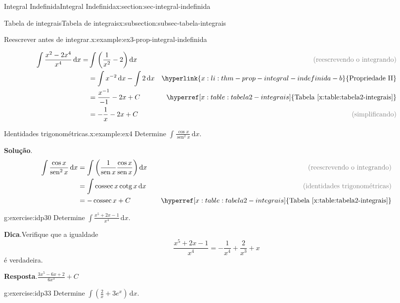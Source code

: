 \documentclass[oneside,10pt,]{article}
\newcommand{\blocktitlefont}{\relax}
\newcommand{\xreffont}{\relax}
\numberwithin{equation}{section}
\newcommand{\dd}{\mathrm{d}}
\newcommand{\integral}[2]{\displaystyle\int {#1}\,\dd {#2}}
\DeclareMathOperator{\sin}{sen}
\DeclareMathOperator{\csc}{cossec}
\DeclareMathOperator{\cot}{cotg}
\newcommand{\amp}{&}
\begin{document}
\begin{sectionptx}{Integral Indefinida}{}{Integral Indefinida}{}{}{x:section:sec-integral-indefinida}
\begin{subsectionptx}{Tabela de integrais}{}{Tabela de integrais}{}{}{x:subsection:subsec-tabela-integrais}
\begin{example}{Reescrever antes de integrar.}{x:example:ex3-prop-integral-indefinida}
\par\smallskip%
\noindent%
\begin{align*}
\integral{\frac{x^2- 2x^4}{x^4}}{x} = \amp \integral{\left(\frac{1}{x^2}-2\right)}{x} \quad \amp \color{gray}{\text{(reescrevendo o integrando)}}\\
\amp =\integral{x^{-2}}{x}-\integral{2}{x} \amp \hyperlink{x:li:thm-prop-integral-indefinida-b}{\text{Propriedade II}}\\
\amp =\frac{x^{-1}}{-1}-2x + C  \amp \hyperref[x:table:tabela2-integrais]{\text{Tabela {\xreffont\ref{x:table:tabela2-integrais}}}}\\
\amp =-\frac{1}{x}-2x + C \amp \color{gray}{\text{(simplificando)}}
\end{align*}
%
%
\end{example}
\begin{example}{Identidades trigonométricas.}{x:example:ex4}%
Determine \(\integral{\frac{\cos{x}}{\sin^2{x}}}{x}\).%
\par\smallskip%
\noindent\textbf{\blocktitlefont Solução}.\hypertarget{g:solution:idp29}{}\quad{}%
\begin{align*}
\integral{\frac{\cos{x}}{\sin^2{x}}}{x}\amp = \integral{\left(\frac{1}{\sin{x}}\frac{\cos{x}}{\sin{x}}\right)}{x} \quad \amp\color{gray}{\text{(reescrevendo o integrando)}}\\
\amp = \integral{\csc{x}\cot{x}}{x} \amp \color{gray}{\text{(identidades trigonométricas)}}\\
\amp = -\csc{x} + C \quad \amp \hyperref[x:table:tabela2-integrais]{\text{Tabela {\xreffont\ref{x:table:tabela2-integrais}}}}
\end{align*}
%
\end{example}
\begin{inlineexercise}{}{g:exercise:idp30}%
Determine \(\integral{\frac{x^5+ 2x-1}{x^4}}{x}\).%
\par\smallskip%
\noindent\textbf{\blocktitlefont Dica}.\hypertarget{g:hint:idp31}{}\quad{}Verifique que a igualdade%
\begin{equation*}
\frac{x^5+ 2x-1}{x^4}=-\frac{1}{x^4}+ \frac{2}{x^3} + x
\end{equation*}
é verdadeira.%
\par\smallskip%
\noindent\textbf{\blocktitlefont Resposta}.\hypertarget{g:answer:idp32}{}\quad{}\(\frac{3x^5-6x+2}{6x^3} + C\)%
\end{inlineexercise}%
\begin{inlineexercise}{}{g:exercise:idp33}%
Determine \(\integral{\left(\frac{2}{x}+3e^x\right)}{x}\).%

\end{inlineexercise}
\end{subsectionptx}
\end{sectionptx}
\end{document}
